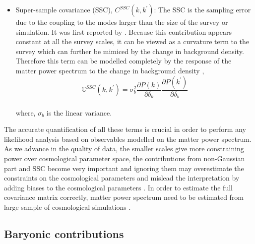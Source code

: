 \begin{itemize}
	\item Super-sample covariance (SSC), $C^{SSC}(k,k^{\prime})$: The SSC is the sampling
			error due to the coupling to the modes larger than the size of the survey or
			simulation. It was first reported by \cite{2006MNRAS.371.1188H}.
			Because this contribution appears constant at all the survey scales, it 
			can be viewed as a curvature term to the survey which can further be mimiced 
			by the change in background density. Therefore this term can be modelled
			completely by the response of the matter power spectrum to the change in background density \cite{2013PhRvD..87l3504T,2014PhRvD..90j3530L},
			\begin{equation}
				\mathbb{C}^{SSC}(k,k^{\prime}) = \sigma_b^2 \dfrac{\partial P(k)}{\partial \delta_b}
										\dfrac{\partial P(k^{\prime})}{\partial \delta_b}
			\end{equation}
			\\
			where, $\sigma_b$ is the linear variance. 
\end{itemize}

The accurate quantification of all these terms is crucial in order to perform any
likelihood analysis based on observables modelled on the matter power spectrum. As we
advance in the quality of data, the smaller scales give more constraining power 
over cosmological parameter space, the contributions from non-Gaussian part and SSC
become very important and ignoring them may overestimate the constraints on the 
cosmological parameters and mislead the interpretation by adding biases to the
cosmological parameters 
\cite{2000ApJ...537....1W,2007MNRAS.375L...6S,2008ApJ...686L...1L,2009MNRAS.395.2065T,2011MNRAS.416.1045K}.
In order to estimate the full covariance matrix correctly, matter power spectrum
need to be estimated from large sample of cosmological simulations
\cite{2013MNRAS.432.1928T,2009ApJ...700..479T,2015MNRAS.446.1756B}.


\subsection{Baryonic contributions}\label{sec:baryons}

